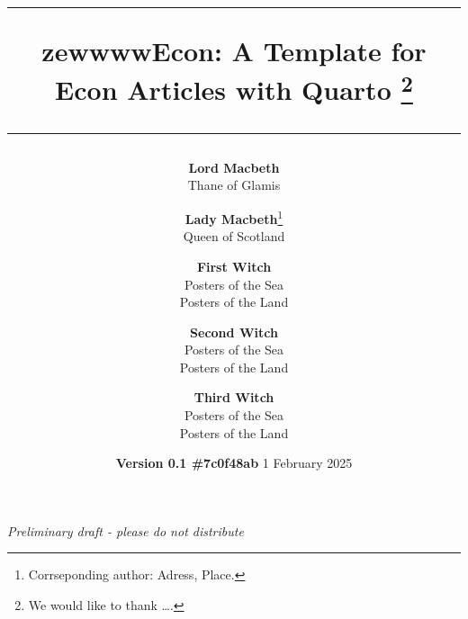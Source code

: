 \documentclass[12pt,a4paper,oneside]{article} %
\begin{document}

\setlength{\droptitle}{-8em}  %
	\title{	\rule{\linewidth}{0.5mm} \textbf{
		{\LARGE zewwwwEcon: A Template for Econ Articles with
Quarto \vspace{-15pt} }}\thanks{\noindent { }We would like to thank
\ldots.}  \rule{\linewidth}{0.5mm}  }
\date{\hspace{87pt}\scriptsize{\textbf{Version
0.1 \#7c0f48ab}} \vspace{-5pt} \newline  \normalsize 1 February 2025} 

\author{
		\textbf{Lord Macbeth}\\
	\small{Thane of Glamis}\vspace{-1.5ex}\\
	\and	\textbf{Lady Macbeth}\thanks{ { }Corrseponding author: Adress,
Place.}\\
	\small{Queen of Scotland}\vspace{-1.5ex}\\
	\and	\textbf{First Witch}\\
	\small{Posters of the Sea}\vspace{-1.5ex}\\
	\small{Posters of the Land}\vspace{-1.5ex}\\
	\and	\textbf{Second Witch}\\
	\small{Posters of the Sea}\vspace{-1.5ex}\\
	\small{Posters of the Land}\vspace{-1.5ex}\\
	\and	\textbf{Third Witch}\\
	\small{Posters of the Sea}\vspace{-1.5ex}\\
	\small{Posters of the Land}\vspace{-1.5ex}\\
	\vspace{10pt}}

\maketitle
\thispagestyle{empty}

\begin{center}
\vspace{-25pt}	\noindent \textit{Preliminary draft - please do not
distribute}
\end{center}
\end{document}
